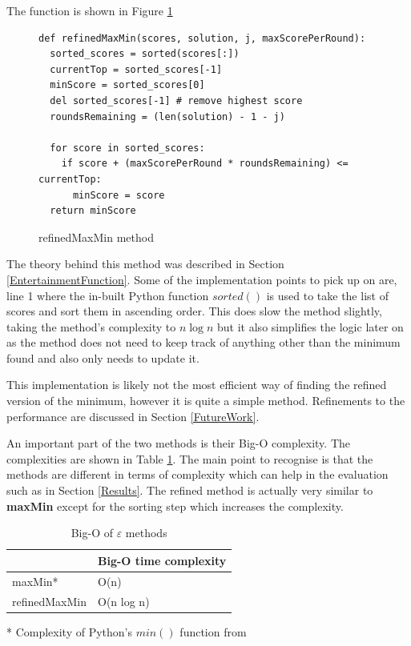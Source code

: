 \documentclass[12pt]{report}
\begin{document}
The function is shown in Figure \ref{refMaxMin}

\begin{figure}[H]
\caption{refinedMaxMin method}
\label{refMaxMin}
\begin{lstlisting}
def refinedMaxMin(scores, solution, j, maxScorePerRound):
  sorted_scores = sorted(scores[:])
  currentTop = sorted_scores[-1]
  minScore = sorted_scores[0]
  del sorted_scores[-1] # remove highest score
  roundsRemaining = (len(solution) - 1 - j)

  for score in sorted_scores:
    if score + (maxScorePerRound * roundsRemaining) <= currentTop:
      minScore = score
  return minScore
\end{lstlisting}
\end{figure}

The theory behind this method was described in Section \ref{EntertainmentFunction}. Some of the implementation points to pick up on are, line 1 where the in-built Python function $sorted()$\cite{PythonSorted} is used to take the list of scores and sort them in ascending order. This does slow the method slightly, taking the method's complexity to $n \log n$ but it also simplifies the logic later on as the method does not need to keep track of anything other than the minimum found and also only needs to update it.

This implementation is likely not the most efficient way of finding the refined version of the minimum, however it is quite a simple method. Refinements to the performance are discussed in Section \ref{FutureWork}.

An important part of the two methods is their Big-O complexity. The complexities are shown in Table \ref{maxMinComp}. The main point to recognise is that the methods are different in terms of complexity which can help in the evaluation such as in Section \ref{Results}. The refined method is actually very similar to \textbf{maxMin} except for the sorting step which increases the complexity.

\begin{table}[H]
\centering
\caption{Big-O of $\varepsilon$ methods}
\label{maxMinComp}
\begin{tabular}{|l|l|}
\hline
              & Big-O time complexity \\ \hline
maxMin*  & O(n) \\ \hline
refinedMaxMin & O(n log n)               \\ \hline
\end{tabular}
\end{table}
* Complexity of Python's $min()$ function from\cite{PythonComplexities}
\end{document}
